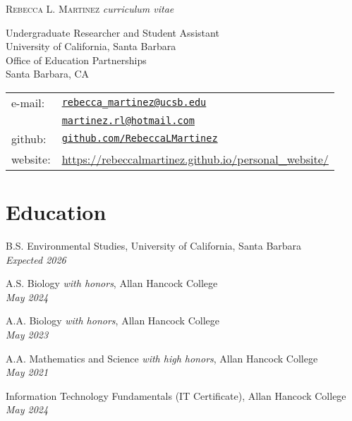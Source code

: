 \documentclass[letterpaper]{article}
\def\name{Rebecca L. Martinez}
\renewenvironment{itemize}{
  \begin{list}{}{
    \setlength{\leftmargin}{1.5em}
  }
}{
  \end{list}
}
\begin{document}
{\LARGE \scshape \name}
{\emph{curriculum vitae}}

\vspace{0.25in}

\begin{minipage}{0.55\linewidth}
Undergraduate Researcher and Student Assistant\\
University of California, Santa Barbara\\
Office of Education Partnerships\\
Santa Barbara, CA
\end{minipage}
\begin{minipage}{0.45\linewidth}
  \begin{tabular}{ll}
    e-mail: & \href{mailto:rebecca_martinez@ucsb.edu}{\tt rebecca\_martinez@ucsb.edu} \\
            & \href{mailto:martinez.rl@hotmail.com}{\tt martinez.rl@hotmail.com} \\
    github: & \href{https://github.com/RebeccaLMartinez}{\tt github.com/RebeccaLMartinez} \\
website: & \href{https://rebeccalmartinez.github.io/personal_website/}{\url{https://rebeccalmartinez.github.io/personal_website/}}

  \end{tabular}
\end{minipage}

\vspace{0.2in}

\section*{Education}

\begin{itemize}

  \item B.S. Environmental Studies, University of California, Santa Barbara \\
  \textit{Expected 2026}

  \item A.S. Biology \textit{with honors}, Allan Hancock College \\
  \textit{May 2024}

  \item A.A. Biology \textit{with honors}, Allan Hancock College \\
  \textit{May 2023}

  \item A.A. Mathematics and Science \textit{with high honors}, Allan Hancock College \\
  \textit{May 2021}

  \item Information Technology Fundamentals (IT Certificate), Allan Hancock College \\
  \textit{May 2024}

\end{itemize}
\end{document}
